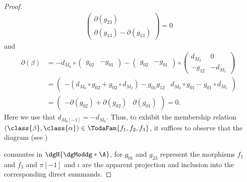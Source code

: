 \documentclass[a4paper]{amsart}
\begin{document}
\begin{proof}
\begin{align*}
\begin{pmatrix}
                          \partial(g_{23}) \\
                          \partial(g_{13})-\partial(g_{13})
                        \end{pmatrix}=0
  \end{align*}
  and
  \begin{align*}
    \partial(\beta) & = -d_{M_0}\circ                                                                                       %
                      \begin{pmatrix}
                        g_{02} & -g_{01}
                      \end{pmatrix}-%
                      \begin{pmatrix}
                        g_{02} & -g_{01}
                      \end{pmatrix}\circ%
                      \begin{pmatrix}
                        d_{M_2} & 0 \\ -g_{12} & -d_{M_1}
                      \end{pmatrix}                                                                                       \\
                    & =\begin{pmatrix}
                         -(d_{M_0}\circ g_{02}+g_{02}\circ d_{M_2})-g_{01}g_{12} & d_{M_0}\circ g_{01}-g_{01}\circ d_{M_1}
                       \end{pmatrix} \\
                    & =\begin{pmatrix}
                         -\partial(g_{02})+\partial(g_{02}) & \partial(g_{01})
                       \end{pmatrix}=0.
  \end{align*}
  Here we use that $d_{M_0[-1]}=-d_{M_0}$. Thus, to exhibit the membership
  relation $(\class{\beta},\class{\alpha})\in\TodaFam{f_1,f_2,f_3}$, it suffices
  to observe that the diagram (see )
  \begin{center}
  \end{center}
  commutes in $\dgH{\dgModdg*{\A}}$, for $g_{01}$ and $g_{23}$ represent the
  morphisms $f_1$ and $f_3$ and $\pi[-1]$ and $\iota$ are the apparent
  projection and inclusion into the corresponding direct summands.


\end{proof}
\end{document}
